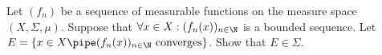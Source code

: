 Let $(f_n)$ be a sequence of measurable functions on the measure
space $(X,\Sigma,\mu)$. Suppose that $\forall x\in X:(f_n(x))_{n\in
\N}$ is a bounded sequence. Let $E=\{x\in X \pipe (f_n(x))_{n\in \N}
\text{\ converges}\}$. Show that $E\in \Sigma$.
